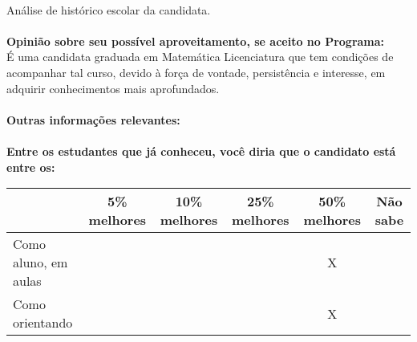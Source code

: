 \documentclass[11pt]{article}
\begin{document}
\\Análise de histórico escolar da candidata.\\
\\
\textbf{Opinião sobre seu possível aproveitamento, se aceito no Programa:}
\\É uma candidata graduada em Matemática Licenciatura que tem condições de acompanhar tal curso, devido à força de vontade, persistência e interesse, em adquirir conhecimentos mais aprofundados.\\ 
\\
\textbf{Outras informações relevantes:} \\
\\[0.3cm]
\textbf{Entre os estudantes que já conheceu, você diria que o candidato está entre os:}
\\
\begin{tabular}{|l|c|c|c|c|c|}
\hline
 & 5\% melhores & 10\% melhores & 25\% melhores & 50\% melhores & Não sabe \\
\hline
Como aluno, em aulas &  &  &  & X & \\
\hline
Como orientando &  &  &  & X & \\
\hline
\end{tabular}
\end{document}
